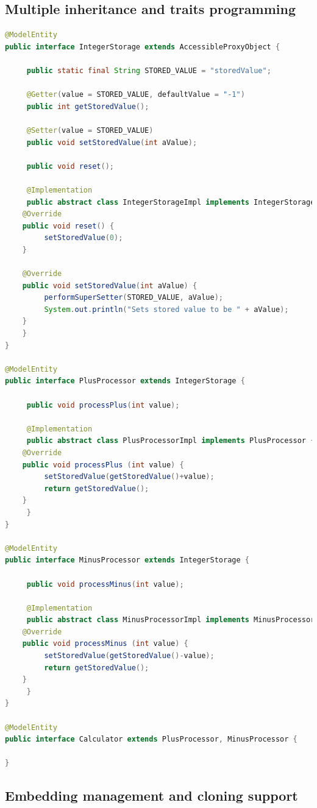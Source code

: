 \subsection{Multiple inheritance and traits programming}

\begin{lstlisting}[language=Java,basicstyle=\ttfamily\footnotesize]
@ModelEntity
public interface IntegerStorage extends AccessibleProxyObject {

     public static final String STORED_VALUE = "storedValue";

     @Getter(value = STORED_VALUE, defaultValue = "-1")
     public int getStoredValue();

     @Setter(value = STORED_VALUE)
     public void setStoredValue(int aValue);

     public void reset();

     @Implementation
     public abstract class IntegerStorageImpl implements IntegerStorage {
	@Override
	public void reset() {
	     setStoredValue(0);
	}

	@Override
	public void setStoredValue(int aValue) {
	     performSuperSetter(STORED_VALUE, aValue);
	     System.out.println("Sets stored value to be " + aValue);
	}
    }
}

@ModelEntity
public interface PlusProcessor extends IntegerStorage {

     public void processPlus(int value);

     @Implementation
     public abstract class PlusProcessorImpl implements PlusProcessor {
	@Override
	public void processPlus (int value) {
	     setStoredValue(getStoredValue()+value);
	     return getStoredValue();
	}
     }
}

@ModelEntity
public interface MinusProcessor extends IntegerStorage {

     public void processMinus(int value);

     @Implementation
     public abstract class MinusProcessorImpl implements MinusProcessor {
	@Override
	public void processMinus (int value) {
	     setStoredValue(getStoredValue()-value);
	     return getStoredValue();
	}
     }
}

@ModelEntity
public interface Calculator extends PlusProcessor, MinusProcessor {

}

\end{lstlisting}

\subsection{Embedding management and cloning support}

